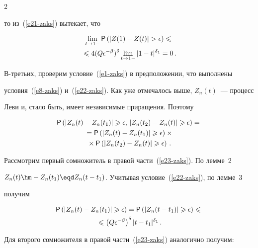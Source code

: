 \begin{multicols}{2}
\begin{equation}
\end{equation}

то из~(\ref{e21-zaks}) вытекает, что

\begin{multline*}

\lim\limits_{t\to1-}{\sf P}\left(|Z(1)-Z(t)|>\epsilon\right)\leqslant{}\\

{}\leqslant

4(Q\epsilon^{-\beta})^{\delta}\lim\limits_{t\to1-}|1-t|^{\delta_1}=0\,.

\end{multline*}



В-третьих, проверим условие~(\ref{e1-zaks}) в предположении, что выполнены

условия~(\ref{e8-zaks}) и~(\ref{e22-zaks}). Как уже отмечалось выше, $Z_n(t)$~--- процесс

Леви и, стало быть, имеет независимые приращения. Поэтому

\begin{multline}

{\sf P}\left(|Z_n(t)-Z_n(t_1)|\geqslant\epsilon,\,|Z_n(t_2)-Z_n(t)|\geqslant\epsilon\right)={}\\

{}={\sf P}\left(|Z_n(t)-Z_n(t_1)|\geqslant\epsilon\right)\times{}\\

{}\times{\sf P}\left(|Z_n(t_2)-Z_n(t)|\geqslant\epsilon\right)\,.\label{e23-zaks}

\end{multline}

Рассмотрим первый сомножитель в правой час\-ти~(\ref{e23-zaks}). По лемме~2

$Z_n(t)\hm-Z_n(t_1)\eqd Z_n(t-t_1)$. Учитывая условие~(\ref{e22-zaks}), по лемме~3

получим

\begin{multline}

{\sf P}\left(|Z_n(t)-Z_n(t_1)|\geqslant\epsilon\right)={\sf P}

\left(|Z_n(t-t_1)|\geqslant\epsilon\right)\leqslant{}\\

{}\leqslant \left(Q\epsilon^{-\beta}\right)^{\delta}|t-t_1|^{\delta_1}\,.\label{e24-zaks}

\end{multline}

Для второго сомножителя в правой части~(\ref{e23-zaks}) аналогично получим:


\end{multicols}

